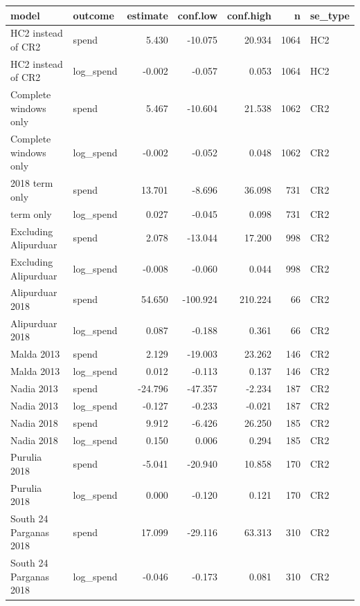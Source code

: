 
\begin{tabular}{llrrrrl}
\toprule
model & outcome & estimate & conf.low & conf.high & n & se\_type\\
\midrule
HC2 instead of CR2 & spend & 5.430 & -10.075 & 20.934 & 1064 & HC2\\
HC2 instead of CR2 & log\_spend & -0.002 & -0.057 & 0.053 & 1064 & HC2\\
Complete windows only & spend & 5.467 & -10.604 & 21.538 & 1062 & CR2\\
Complete windows only & log\_spend & -0.002 & -0.052 & 0.048 & 1062 & CR2\\
2018 term only & spend & 13.701 & -8.696 & 36.098 & 731 & CR2\\
\addlinespace
2018 term only & log\_spend & 0.027 & -0.045 & 0.098 & 731 & CR2\\
Excluding Alipurduar & spend & 2.078 & -13.044 & 17.200 & 998 & CR2\\
Excluding Alipurduar & log\_spend & -0.008 & -0.060 & 0.044 & 998 & CR2\\
Alipurduar 2018 & spend & 54.650 & -100.924 & 210.224 & 66 & CR2\\
Alipurduar 2018 & log\_spend & 0.087 & -0.188 & 0.361 & 66 & CR2\\
\addlinespace
Malda 2013 & spend & 2.129 & -19.003 & 23.262 & 146 & CR2\\
Malda 2013 & log\_spend & 0.012 & -0.113 & 0.137 & 146 & CR2\\
Nadia 2013 & spend & -24.796 & -47.357 & -2.234 & 187 & CR2\\
Nadia 2013 & log\_spend & -0.127 & -0.233 & -0.021 & 187 & CR2\\
Nadia 2018 & spend & 9.912 & -6.426 & 26.250 & 185 & CR2\\
\addlinespace
Nadia 2018 & log\_spend & 0.150 & 0.006 & 0.294 & 185 & CR2\\
Purulia 2018 & spend & -5.041 & -20.940 & 10.858 & 170 & CR2\\
Purulia 2018 & log\_spend & 0.000 & -0.120 & 0.121 & 170 & CR2\\
South 24 Parganas 2018 & spend & 17.099 & -29.116 & 63.313 & 310 & CR2\\
South 24 Parganas 2018 & log\_spend & -0.046 & -0.173 & 0.081 & 310 & CR2\\
\bottomrule
\end{tabular}
